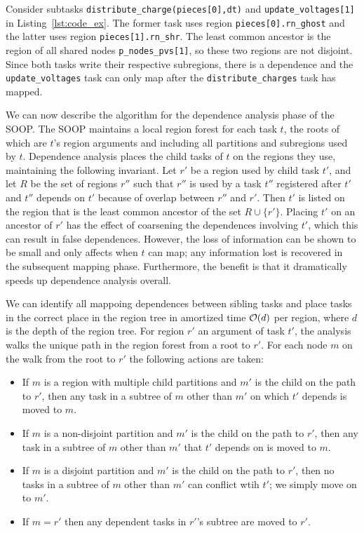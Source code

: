 Consider subtasks {\tt distribute\_charge(pieces[0],dt)} and
{\tt update\_voltages[1]} in Listing~\ref{lst:code_ex}.  The former task
uses region {\tt pieces[0].rn\_ghost} and the latter uses region {\tt pieces[1].rn\_shr}.
The least common ancestor is the region of all shared nodes {\tt p\_nodes\_pvs[1]},
so these two regions are not disjoint.  Since both tasks write their respective subregions,
there is a dependence and the {\tt update\_voltages} task can only map after the
{\tt distribute\_charges} task has mapped.

We can now describe the algorithm for the dependence analysis phase of
the SOOP.  The SOOP maintains a local region forest for each task $t$,
the roots of which are $t$'s region arguments and including all
partitions and subregions used by $t$.  Dependence analysis
places the child tasks of $t$ on the regions they use, maintaining the
following invariant. Let $r'$ be a region used by child task $t'$,
and let $R$ be the set of regions $r''$ such that $r''$ is used
by a task $t''$ registered after $t'$ and $t''$ depends on $t'$
because of overlap between $r''$ and $r'$.  Then $t'$ is listed on the
region that is the least common ancestor of the set $R \cup \{r'\}$.
Placing $t'$ on an ancestor of $r'$ has the effect of coarsening the
dependences involving $t'$, which
this can result in false dependences.  However, the loss of
information can be shown to be small and only affects when $t$ can
map; any information lost is recovered in the subsequent mapping
phase.  Furthermore, the benefit is that it dramatically speeds up
dependence analysis overall.

We can identify all mappoing dependences between sibling tasks and place tasks
in the correct place in the region tree in amortized time ${\cal O}(d)$ per region,
where $d$ is the depth of the region tree.  For region $r'$ an argument of task $t'$, the analysis
walks the unique path in the region forest from a root to $r'$.  For each node $m$
on the walk from the root to $r'$ the following actions are taken:
\begin{itemize}
\item If $m$ is a region with multiple child partitions and $m'$ is the child on the
path to $r'$, then any task in a subtree of $m$ other than $m'$ on which $t'$ depends 
is moved to $m$.

\item If $m$ is a non-disjoint partition and $m'$ is the child on the
path to $r'$, then any task in a subtree of $m$ other than $m'$ that $t'$ depends on is
moved to $m$.

\item If $m$ is a disjoint partition and $m'$ is the child on the
path to $r'$, then no tasks in a subtree of $m$ other than $m'$ can conflict wtih $t'$; we simply move
on to $m'$.

\item If $m = r'$ then any dependent tasks in $r'$'s subtree are moved to $r'$.
\end{itemize}

